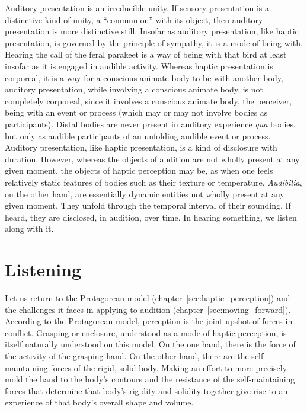 Auditory presentation is an irreducible unity. If sensory presentation is a distinctive kind of unity, a ``communion'' with its object, then auditory presentation is more distinctive still. Insofar as auditory presentation, like haptic presentation, is governed by the principle of sympathy, it is a mode of being with. Hearing the call of the feral parakeet is a way of being with that bird at least insofar as it is engaged in audible activity. Whereas haptic presentation is corporeal, it is a way for a conscious animate body to be with another body, auditory presentation, while involving a conscious animate body, is not completely corporeal, since it involves a conscious animate body, the perceiver, being with an event or process (which may or may not involve bodies as participants). Distal bodies are never present in auditory experience \emph{qua} bodies, but only as audible participants of an unfolding audible event or process. Auditory presentation, like haptic presentation, is a kind of disclosure with duration. However, whereas the objects of audition are not wholly present at any given moment, the objects of haptic perception may be, as when one feels relatively static features of bodies such as their texture or temperature. \emph{Audibilia}, on the other hand, are essentially dynamic entities not wholly present at any given moment. They unfold through the temporal interval of their sounding. If heard, they are disclosed, in audition, over time. In hearing something, we listen along with it.


\section{Listening} %
\label{sec:listening}

Let us return to the Protagorean model (chapter~\ref{sec:haptic_perception}) and the challenges it faces in applying to audition (chapter~\ref{sec:moving_forward}). According to the Protagorean model, perception is the joint upshot of forces in conflict. Grasping or enclosure, understood as a mode of haptic perception, is itself naturally understood on this model. On the one hand, there is the force of the activity of the grasping hand. On the other hand, there are the self-maintaining forces of the rigid, solid body. Making an effort to more precisely mold the hand to the body's contours and the resistance of the self-maintaining forces that determine that body's rigidity and solidity together give rise to an experience of that body's overall shape and volume. 

